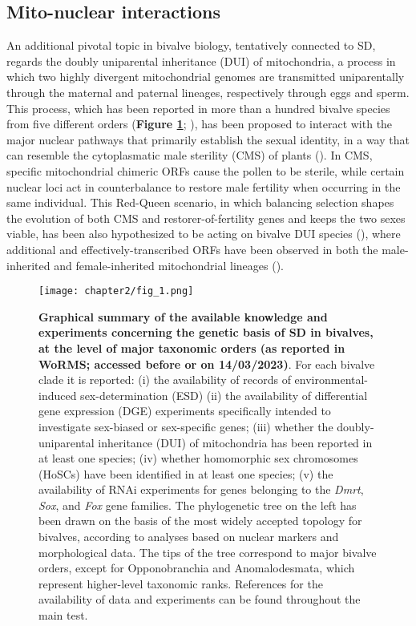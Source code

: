 \documentclass[../main.tex]{subfiles}
\begin{document}
\subsection{Mito-nuclear interactions}
An additional pivotal topic in bivalve biology, tentatively connected to SD, regards the doubly uniparental inheritance (DUI) of mitochondria, a process in which two highly divergent mitochondrial genomes are transmitted uniparentally through the maternal and paternal lineages, respectively through eggs and sperm. This process, which has been reported in more than a hundred bivalve species from five different orders (\textbf{Figure \ref{fig:summarySex}}; \textbf{\cite{gusman2016pursuing,capt2020unorthodox}}), has been proposed to interact with the major nuclear pathways that primarily establish the sexual identity, in a way that can resemble the cytoplasmatic male sterility (CMS) of plants (\textbf{\cite{ghiselli2013structure,breton2022did}}). In CMS, specific mitochondrial chimeric ORFs cause the pollen to be sterile, while certain nuclear loci act in counterbalance to restore male fertility when occurring in the same individual. This Red-Queen scenario, in which balancing selection shapes the evolution of both CMS and restorer-of-fertility genes and keeps the two sexes viable, has been also hypothesized to be acting on bivalve DUI species (\textbf{\cite{ghiselli2013structure,xu2022lack}}), where additional and effectively-transcribed ORFs have been observed in both the male-inherited and female-inherited mitochondrial lineages (\textbf{\cite{milani2013nuclear,milani2014paternally}}).

\begin{figure}
    \centering
    \texttt{[image: chapter2/fig\_1.png]}
    \captionsetup{width=\textwidth}
    \caption[font=sf]{
    \textbf{Graphical summary of the available knowledge and experiments concerning the genetic basis of SD in bivalves, at the level of major taxonomic orders (as reported in WoRMS; accessed before or on 14/03/2023)}. For each bivalve clade it is reported: (i) the availability of records of environmental-induced sex-determination (ESD) (ii) the availability of differential gene expression (DGE) experiments specifically intended to investigate sex-biased or sex-specific genes; (iii) whether the doubly-uniparental inheritance (DUI) of mitochondria has been reported in at least one species; (iv) whether homomorphic sex chromosomes (HoSCs) have been identified in at least one species; (v) the availability of RNAi experiments for genes belonging to the \textit{Dmrt}, \textit{Sox}, and \textit{Fox} gene families. The phylogenetic tree on the left has been drawn on the basis of the most widely accepted topology for bivalves, according to analyses based on nuclear markers and morphological data. The tips of the tree correspond to major bivalve orders, except for Opponobranchia and Anomalodesmata, which represent higher-level taxonomic ranks. References for the availability of data and experiments can be found throughout the main test.
    }
    \label{fig:summarySex}
\end{figure}
\end{document}

